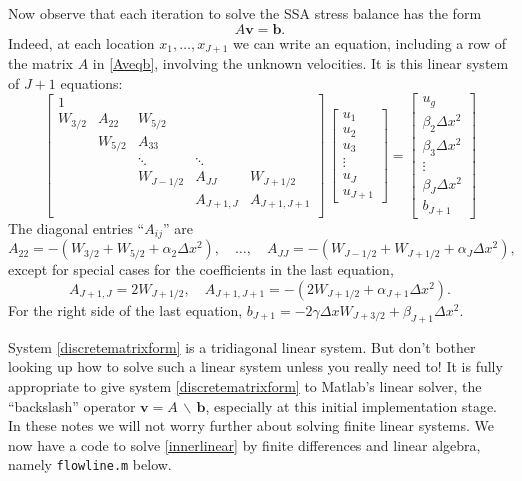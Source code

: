 \documentclass[letterpaper,final,12pt,reqno]{amsart}
\begin{document}
Now observe that each iteration to solve the SSA stress balance has the form
\begin{equation}
   A \mathbf{v} = \mathbf{b}. \label{Aveqb}
\end{equation}
Indeed, at each location $x_1,\dots,x_{J+1}$ we can write an equation, including a row of the matrix $A$ in \eqref{Aveqb}, involving the unknown velocities.  It is this linear system of $J+1$ equations:
\begin{equation}
\begin{bmatrix}
1 &  &  &  &  \\
W_{3/2} & A_{22} & W_{5/2} &  &  \\
 & W_{5/2} & A_{33} &  &  \\
 &  & \ddots & \ddots &  \\
 &  & W_{J-1/2} & A_{JJ} & W_{J+1/2} \\
 &  &  & A_{J+1,J} & A_{J+1,J+1} \\
\end{bmatrix}\,
\begin{bmatrix}
u_1 \\ u_2 \\ u_3 \\ \vdots \\ u_J \\ u_{J+1}
\end{bmatrix}
=
\begin{bmatrix}
u_g \\ \beta_2 \Delta x^2 \\ \beta_3 \Delta x^2 \\ \vdots \\ \beta_J \Delta x^2 \\ b_{J+1}
\end{bmatrix}  \label{discretematrixform}
\end{equation}
The diagonal entries ``$A_{ij}$'' are
  $$A_{22} = -(W_{3/2}+W_{5/2}+\alpha_2 \Delta x^2), \quad \dots, \quad A_{JJ} = -(W_{J-1/2}+W_{J+1/2}+\alpha_J \Delta x^2),$$
except for special cases for the coefficients in the last equation,
  $$A_{J+1,J} = 2 W_{J+1/2}, \quad A_{J+1,J+1} = -(2 W_{J+1/2}+\alpha_{J+1}\Delta x^2).$$
For the right side of the last equation, $b_{J+1} = -2 \gamma \Delta x W_{J+3/2} + \beta_{J+1} \Delta x^2$.

System \eqref{discretematrixform} is a tridiagonal linear system.  But don't bother looking up how to solve such a linear system unless you really need to!  It is fully appropriate to give system \eqref{discretematrixform} to Matlab's linear solver, the ``backslash'' operator $\mathbf{v} = A\, \backslash\, \mathbf{b}$, especially at this initial implementation stage.  In these notes we will not worry further about solving finite linear systems.  We now have a code to solve \eqref{innerlinear} by finite differences and linear algebra, namely \texttt{flowline.m} below.
\end{document}
